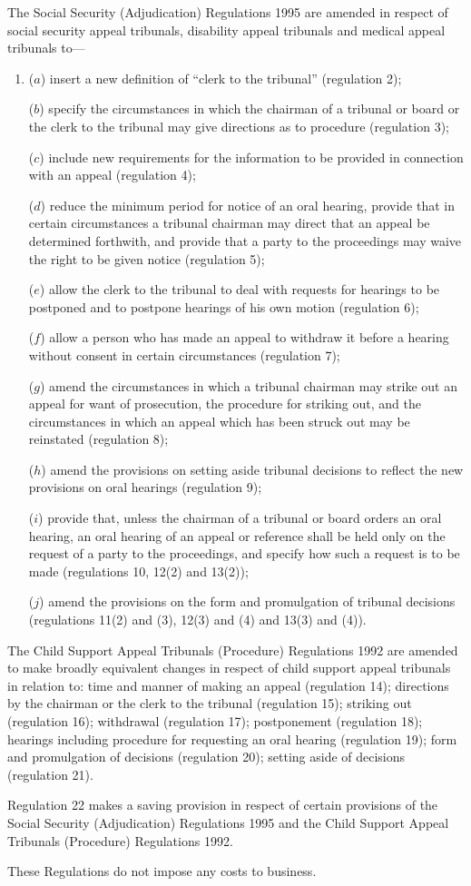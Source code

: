 \documentclass[12pt,a4paper]{article}
\begin{document}
 The Social Security (Adjudication) Regulations 1995 are amended in respect of social security appeal tribunals, disability appeal tribunals and medical appeal tribunals to—
\begin{enumerate}\item[]
 ($a$) insert a new definition of “clerk to the tribunal” (regulation 2);

 ($b$) specify the circumstances in which the chairman of a tribunal or board or the clerk to the tribunal may give directions as to procedure (regulation 3);

 ($c$) include new requirements for the information to be provided in connection with an appeal (regulation 4);

 ($d$) reduce the minimum period for notice of an oral hearing, provide that in certain circumstances a tribunal chairman may direct that an appeal be determined forthwith, and provide that a party to the proceedings may waive the right to be given notice (regulation 5);

 ($e$) allow the clerk to the tribunal to deal with requests for hearings to be postponed and to postpone hearings of his own motion (regulation 6);

 ($f$) allow a person who has made an appeal to withdraw it before a hearing without consent in certain circumstances (regulation 7);

 ($g$) amend the circumstances in which a tribunal chairman may strike out an appeal for want of prosecution, the procedure for striking out, and the circumstances in which an appeal which has been struck out may be reinstated (regulation 8);

 ($h$) amend the provisions on setting aside tribunal decisions to reflect the new provisions on oral hearings (regulation 9);

 ($i$) provide that, unless the chairman of a tribunal or board orders an oral hearing, an oral hearing of an appeal or reference shall be held only on the request of a party to the proceedings, and specify how such a request is to be made (regulations 10, 12(2) and 13(2));

 ($j$) amend the provisions on the form and promulgation of tribunal decisions (regulations 11(2) and (3), 12(3) and (4) and 13(3) and (4)).
\end{enumerate}

\begin{sloppypar}
  The Child Support Appeal Tribunals (Procedure) Regulations 1992 are amended to make broadly equivalent changes in respect of child support appeal tribunals in relation to: time and manner of making an appeal (regulation 14); directions by the chairman or the clerk to the tribunal (regulation 15); striking out (regulation 16); withdrawal (regulation 17); postponement (regulation 18); hearings including procedure for requesting an oral hearing (regulation 19); form and promulgation of decisions (regulation 20); setting aside of decisions (regulation 21).
\end{sloppypar}

  Regulation 22 makes a saving provision in respect of certain provisions of the Social Security (Adjudication) Regulations 1995 and the Child Support Appeal Tribunals (Procedure) Regulations 1992.

  These Regulations do not impose any costs to business.
\end{document}
